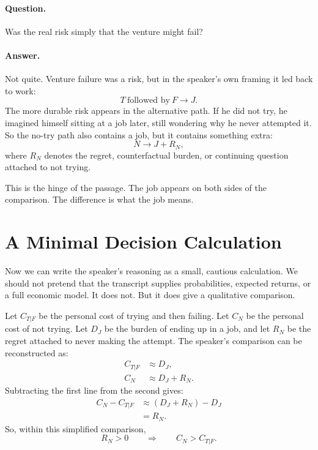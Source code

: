 \paragraph{Question.}
Was the real risk simply that the venture might fail?

\paragraph{Answer.}
Not quite. Venture failure was a risk, but in the speaker's own framing it led back to work:
\begin{equation}
T \ \text{followed by} \ F \longrightarrow J.
\end{equation}
The more durable risk appears in the alternative path. If he did not try, he imagined himself sitting at a job later, still wondering why he never attempted it. So the no-try path also contains a job, but it contains something extra:
\begin{equation}
N \longrightarrow J + R_N,
\end{equation}
where \(R_N\) denotes the regret, counterfactual burden, or continuing question attached to not trying.

This is the hinge of the passage. The job appears on both sides of the comparison. The difference is what the job means.

\section{A Minimal Decision Calculation}

Now we can write the speaker's reasoning as a small, cautious calculation. We should not pretend that the transcript supplies probabilities, expected returns, or a full economic model. It does not. But it does give a qualitative comparison.

Let \(C_{T|F}\) be the personal cost of trying and then failing. Let \(C_N\) be the personal cost of not trying. Let \(D_J\) be the burden of ending up in a job, and let \(R_N\) be the regret attached to never making the attempt. The speaker's comparison can be reconstructed as:
\begin{align}
C_{T|F} &\approx D_J, \\
C_N &\approx D_J + R_N.
\end{align}
Subtracting the first line from the second gives:
\begin{align}
C_N - C_{T|F}
&\approx (D_J + R_N) - D_J \\
&= R_N.
\end{align}
So, within this simplified comparison,
\begin{equation}
R_N > 0
\qquad \Longrightarrow \qquad
C_N > C_{T|F}.
\end{equation}

